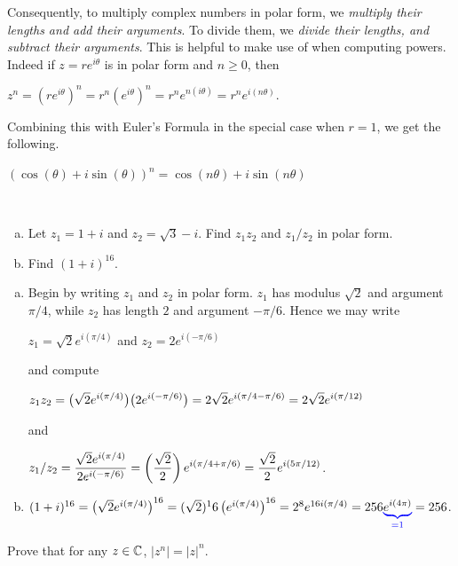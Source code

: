 \documentclass[11pt,fleqn,dvipsnames,usenames]{article}
\newcommand{\p}{\noindent}
\begin{document}
\p Consequently, to multiply complex numbers in polar form, we \emph{multiply their lengths and add their arguments}.  To divide them, we \emph{divide their lengths, and subtract their arguments}.  This is helpful to make use of when computing powers.  Indeed if $z = re^{i\theta}$ is in polar form and $n\geq 0$, then
\begin{center}
$z^{n} = \left(re^{i\theta}\right)^{n} = r^{n}\left(e^{i\theta}\right)^{n} = r^{n}e^{n(i\theta)} = r^{n}e^{i(n\theta)}$.
\end{center}
\vsp

\p Combining this with Euler's Formula in the special case when $r = 1$, we get the following.

\begin{theorem} $(\cos(\theta) + i\sin(\theta))^{n} = \cos(n\theta) + i\sin(n\theta)$
\end{theorem}

\begin{examples}~
\begin{enumerate}[(a)]
\item Let $z_{1} = 1 + i$ and $z_{2}  = \sqrt{3} - i$.  Find $z_{1}z_{2}$ and $z_{1}/z_{2}$ in polar form.
\item Find $(1 + i)^{16}$.
\end{enumerate}
\end{examples}
%
\begin{solution}
\begin{enumerate}[(a)]
\item Begin by writing $z_{1}$ and $z_{2}$ in polar form.  $z_{1}$ has modulus $\sqrt{2}$ and argument $\pi/4$, while $z_{2}$ has length $2$ and argument $-\pi/6$.  Hence we may write
\begin{center}
$z_{1} = \sqrt{2}e^{i(\pi/4)}$ and $z_{2} = 2e^{i(-\pi/6)}$
\end{center}
and compute
\begin{center}
$\displaystyle{z_{1}z_{2} = \big(\sqrt{2}e^{i(\pi/4)}\big)\big(2e^{i(-\pi/6)}\big) = 2\sqrt{2}e^{i(\pi/4-\pi/6)} = 2\sqrt{2}e^{i(\pi/12)}}$
\end{center}
and
\begin{center}
$\displaystyle{z_{1}/z_{2} = \frac{\sqrt{2}e^{i(\pi/4)}}{2e^{i(-\pi/6)}} = \left(\dfrac{\sqrt{2}}{2}\right)e^{i(\pi/4+\pi/6)} = \dfrac{\sqrt{2}}{2}e^{i(5\pi/12)}}$.
\end{center}
\item $(1+i)^{16} = \left(\sqrt{2}e^{i(\pi/4)}\right)^{16} = (\sqrt{2})^16\left(e^{i(\pi/4)}\right)^{16} = 2^{8}e^{16i(\pi/4)} = 256{\color{blue}\underbrace{{\color{black}e^{i(4\pi)}}}_{=1}} = 256$.
\end{enumerate}
\end{solution}
%
\begin{exercise}
Prove that for any $z\in\mathbb{C}$, $|z^{n}| = |z|^{n}$.
\end{exercise}
%
\end{document}
